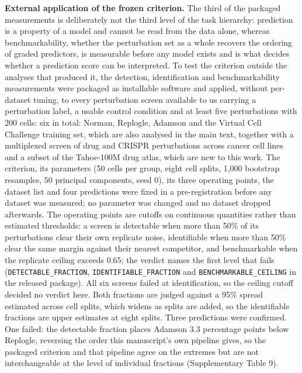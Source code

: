 \documentclass[11pt,letterpaper]{article}
\begin{document}
\textbf{External application of the frozen criterion.} The third of the packaged measurements is deliberately not the third level of the task hierarchy: prediction is a property of a model and cannot be read from the data alone, whereas benchmarkability, whether the perturbation set as a whole recovers the ordering of graded predictors, is measurable before any model exists and is what decides whether a prediction score can be interpreted. To test the criterion outside the analyses that produced it, the detection, identification and benchmarkability measurements were packaged as installable software and applied, without per-dataset tuning, to every perturbation screen available to us carrying a perturbation label, a usable control condition and at least five perturbations with 200 cells: six in total: Norman, Replogle, Adamson and the Virtual Cell Challenge training set\cite{VirtualCellChallenge2025}, which are also analysed in the main text, together with a multiplexed screen of drug and CRISPR perturbations across cancer cell lines\cite{McFarland2020} and a subset of the Tahoe-100M drug atlas\cite{Tahoe100M}, which are new to this work. The criterion, its parameters (50 cells per group, eight cell splits, 1,000 bootstrap resamples, 50 principal components, seed 0), its three operating points, the dataset list and four predictions were fixed in a pre-registration before any dataset was measured; no parameter was changed and no dataset dropped afterwards. The operating points are cutoffs on continuous quantities rather than estimated thresholds: a screen is detectable when more than 50\% of its perturbations clear their own replicate noise, identifiable when more than 50\% clear the same margin against their nearest competitor, and benchmarkable when the replicate ceiling exceeds 0.65; the verdict names the first level that fails (\texttt{DETECTABLE\_FRACTION}, \texttt{IDENTIFIABLE\_FRACTION} and \texttt{BENCHMARKABLE\_CEILING} in the released package). All six screens failed at identification, so the ceiling cutoff decided no verdict here. Both fractions are judged against a 95\% spread estimated across cell splits, which widens as splits are added, so the identifiable fractions are upper estimates at eight splits. Three predictions were confirmed. One failed: the detectable fraction places Adamson 3.3 percentage points below Replogle, reversing the order this manuscript's own pipeline gives, so the packaged criterion and that pipeline agree on the extremes but are not interchangeable at the level of individual fractions (Supplementary Table 9).
\end{document}
